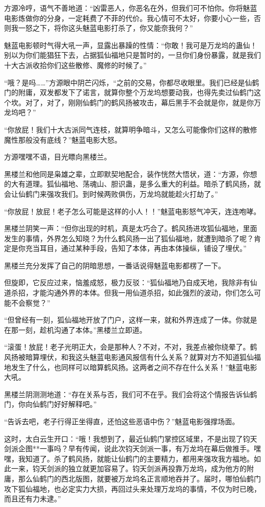 \begin{this_body}
方源冷哼，语气不善地道：“凶雷恶人，你恶名在外，但我们可不怕你。你将魅蓝电影炼做你的分身，一定耗费了不菲的代价。我心情可不太好，你要小心一些，否则我一怒之下，将你这头魅蓝电影打杀了，你又能奈我何？”

魅蓝电影顿时气得大吼一声，显露出暴躁的性情：“你敢！我可是万龙坞的蛊仙！别以为你们能猖狂下去，占据狐仙福地只是暂时的，一旦你们身份暴露，就是我们十大古派收拾你们这些散修、魔修的时候了。”

“哦？是吗……”方源眼中阴芒闪烁，“之前的交易，你都尽收眼里。我们已经是仙鹤门的附庸，双发都发下了诺言，就算你整个万龙坞想要动我，也得先卖过仙鹤门这个坎。对了，对了，刚刚仙鹤门的鹤风扬被攻击，幕后黑手不会就是你，就是你万龙坞吧？”

“你放屁！我们十大古派同气连枝，就算明争暗斗，又怎么可能像你们这样的散修魔性那般没有底线？”魅蓝电影大怒。

方源嘿嘿不语，目光瞟向黑楼兰。

黑楼兰和他同是枭雄之辈，立即默契地配合，装作恍然大悟状，道：“方源，你想的大有道理。狐仙福地、荡魂山、胆识蛊，是多么重大的利益。暗杀了鹤风扬，就会让仙鹤门来强攻我们。到时候两败俱伤，万龙坞就能趁火打劫了。”

“你放屁！放屁！老子怎么可能是这样的小人！！”魅蓝电影怒气冲天，连连咆哮。

黑楼兰阴笑一声：“但你出现的时机，真是太巧合了。鹤风扬进攻狐仙福地，里面发生的事情，外界怎么知晓？为什么鹤风扬一出了狐仙福地，就遭到暗杀了呢？肯定是你充当耳目，通过某种手段，告知了本体，再由本体操纵，铺设了埋伏。”

黑楼兰充分发挥了自己的阴暗思想，一番话说得魅蓝电影都楞了一下。

但旋即，它反应过来，恼羞成怒，极力反驳：“狐仙福地乃自成天地，我除非有仙道杀招，才能沟通外界的本体。但我一用仙道杀招，如此强烈的波动，你们怎么可能不会察觉？”

“但曾经有一刻，狐仙福地开放了门户，这样一来，就和外界连成了一体。你就是在那一刻，趁机沟通了本体。”黑楼兰立即道。

“滚蛋！放屁！老子光明正大，会是那种人？不对，不对，我差点被你绕晕了。鹤风扬被暗算埋伏，和我这头魅蓝电影通风报信有什么关系？就算对方不知道狐仙福地发生了什么，也同样可以暗算鹤风扬。这两者之间不存在什么关系！”魅蓝电影大吼。

黑楼兰阴测测地道：“存在关系与否，我们可不在乎。我们会将这个情报告诉仙鹤门，你向仙鹤门好好解释吧。”

“告诉去吧，老子行得正坐得直，还怕这些恶语中伤？”魅蓝电影强撑场面。

这时，太白云生开口：“哦！我想到了，最近仙鹤门掌控区域里，不是出现了钧天剑派企图**一事吗？早有传闻，说此次钧天剑派一事，有万龙坞在幕后做推手。嘿嘿，我知道了。杀了鹤风扬，就能让仙鹤门的主要精力，都用来强攻我方福地。如此一来，钧天剑派的独立就更加容易了。钧天剑派再投靠万龙坞，成为他方的附庸，那么仙鹤门的西北版图，就要被万龙坞名正言顺地吞并了。届时，哪怕仙鹤门攻下狐仙福地，也必定实力大损，再回过头来处理万龙坞的事情，不仅为时已晚，而且还有力未逮。”


\end{this_body}
